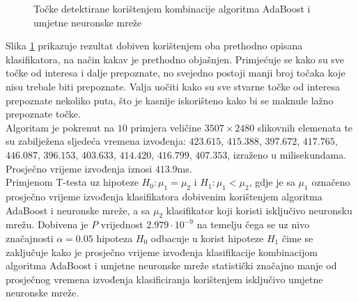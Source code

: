 \documentclass[times, utf8, zavrsni, numeric]{fer}
\begin{document}
\begin{figure}[!ht]
    \centering
    \captionsetup{justification=centering}
    \caption{Točke detektirane korištenjem kombinacije algoritma AdaBoost i umjetne neuronske mreže}
    \label{fig:combinedResult}
\end{figure}

Slika \ref{fig:combinedResult} prikazuje rezultat dobiven korištenjem oba prethodno opisana klasifikatora, na način kakav je prethodno objašnjen.
Primjećuje se kako su sve točke od interesa i dalje prepoznate, no svejedno postoji manji broj točaka koje nisu trebale biti prepoznate.
Valja uočiti kako su sve stvarne točke od interesa prepoznate nekoliko puta, što je kasnije iskorišteno kako bi se maknule lažno prepoznate točke.\\

Algoritam je pokrenut na $10$ primjera veličine $3507\times2480$ slikovnih elemenata te su zabilježena sljedeća vremena izvođenja: $423.615$, $415.388$, $397.672$, $417.765$, $446.087$, $396.153$, $403.633$, $414.420$, $416.799$, $407.353$, izraženo u milisekundama. 
Prosječno vrijeme izvođenja iznosi $413.9$ms.\\

Primjenom T-testa uz hipoteze $H_0: \mu_1 = \mu_2$ i $H_1: \mu_1 < \mu_2$, gdje je sa $\mu_1$ označeno prosječno vrijeme izvođenja klasifikatora dobivenim korištenjem algoritma AdaBoost i neuronske mreže, a sa $\mu_2$ klasifikator koji koristi isključivo neuronsku mrežu.
Dobivena je $P$ vrijednost $2.979\cdot10^{-9}$ na temelju čega se uz nivo značajnosti $\alpha = 0.05$   hipoteza $H_0$ odbacuje u korist hipoteze $H_1$ čime se zaključuje kako je prosječno vrijeme izvođenja klasifikacije kombinacijom algoritma AdaBoost i umjetne neuronske mreže statistički značajno manje od prosječnog vremena izvođenja klasificiranja korištenjem isključivo umjetne neuronske mreže.
\end{document}
